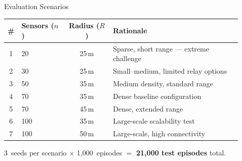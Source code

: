 \documentclass[final]{beamer}
\newlength{\sepwidth}
\newlength{\colwidth}
\newcommand{\separatorcolumn}{\begin{column}{\sepwidth}\end{column}}
\begin{document}
\begin{frame}[t]
\begin{columns}[t]
\begin{column}{\colwidth}
  \begin{block}{Evaluation Scenarios}
    \footnotesize
    \begin{table}
      \centering
      \begin{tabular}{clcl}
        \toprule
        \textbf{\#} & \textbf{Sensors ($n$)} & \textbf{Radius ($R$)} & \textbf{Rationale} \\
        \midrule
        1 & 20  & 25\,m & Sparse, short range --- extreme challenge \\
        2 & 30  & 25\,m & Small--medium, limited relay options \\
        3 & 50  & 35\,m & Medium density, standard range \\
        4 & 70  & 35\,m & Dense baseline configuration \\
        5 & 70  & 45\,m & Dense, extended range \\
        6 & 100 & 35\,m & Large-scale scalability test \\
        7 & 100 & 50\,m & Large-scale, high connectivity \\
        \bottomrule
      \end{tabular}
    \end{table}
    \normalsize
    3~seeds per scenario $\times$ 1,000~episodes $=$ \textbf{21,000 test episodes} total.
  \end{block}

\end{column}

\separatorcolumn

\begin{column}{\colwidth}


\end{column}
\end{columns}
\end{frame}
\end{document}
